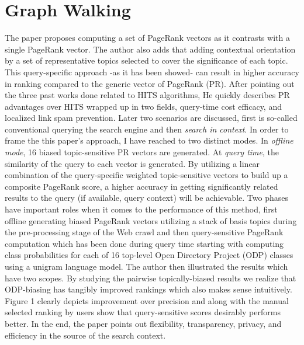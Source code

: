 \documentclass[letterpaper,12pt]{article}
\begin{document}
\section{Graph Walking}
The paper proposes computing a set of PageRank vectors as it contrasts with a single PageRank vector. The author also adds that adding contextual orientation by a set of representative topics selected to cover the significance of each topic. This query-specific approach -as it has been showed- can result in higher accuracy in ranking compared to the generic vector of PageRank (PR). After pointing out the three past works done related to HITS algorithms, He quickly describes PR advantages over HITS wrapped up in two fields, query-time cost efficacy, and localized link spam prevention. Later two scenarios are discussed, first is so-called conventional querying the search engine and then \textit{search in context}. In order to frame the this paper's approach, I have reached to two distinct modes. In \textit{offline mode}, 16 biased topic-sensitive PR vectors are generated. At \textit{query time}, the similarity of the query to each vector is generated. By utilizing a linear combination of the query-specific weighted topic-sensitive vectors to build up a composite PageRank score, a higher accuracy in getting significantly related results to the query (if available, query context) will be achievable. Two phases have important roles when it comes to the performance of this method, first offline generating biased PageRank vectors utilizing a stack of basis topics during the pre-processing stage of the Web crawl and then query-sensitive PageRank computation which has been done during query time starting with computing class probabilities for each of 16 top-level Open Directory Project (ODP) classes using a unigram language model. The author then illustrated the results which have two scopes. By studying the pairwise topically-biased results we realize that ODP-biasing has tangibly improved rankings which also makes sense intuitively. Figure 1 clearly depicts improvement over precision and along with the manual selected ranking by users show that query-sensitive scores desirably performs better. In the end, the paper points out flexibility, transparency, privacy, and efficiency in the source of the search context.
\end{document}
